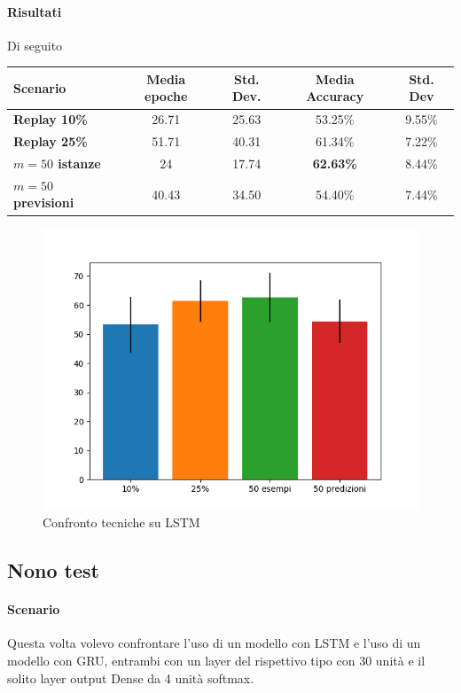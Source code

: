 \documentclass[11pt, a4paper, twoside, openright]{book}
\begin{document}
\paragraph{Risultati} Di seguito\\
\begin{tabular}{l|c|c|c|c}
    \textbf{Scenario} & \textbf{Media epoche} & \textbf{Std. Dev.} & \textbf{Media Accuracy} & \textbf{Std. Dev} \\
    \hline 
    \textbf{Replay 10\%} & 26.71 & 25.63 & 53.25\% & 9.55\% \\
    \textbf{Replay 25\%} & 51.71 & 40.31 & 61.34\% & 7.22\%\\
    \textbf{$m = 50$ istanze} & 24 & 17.74 & \textbf{62.63\%} & 8.44\%\\
    \textbf{$m = 50$ previsioni} & 40.43 & 34.50 & 54.40\% & 7.44\%\\
\end{tabular}
\begin{figure}[h]
    \centering
    \includegraphics[scale=0.75]{img/eigth.png}
    \caption{Confronto tecniche su LSTM}
    \label{fig:eigth}
\end{figure}
\subsection{Nono test}
\paragraph{Scenario} Questa volta volevo confrontare l'uso di un modello con LSTM e l'uso di un modello con GRU, entrambi con un layer del rispettivo tipo con 30 unità e il solito layer output Dense da 4 unità softmax.
\end{document}
